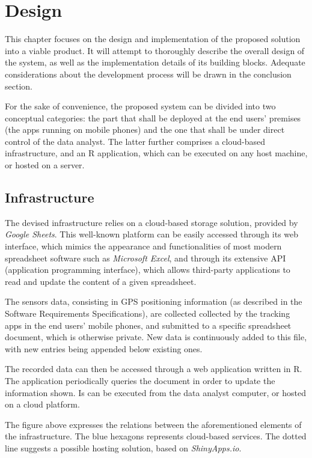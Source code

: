 \chapter{Design}
This chapter focuses on the design and implementation of the proposed solution into a viable product.
It will attempt to thoroughly describe the overall design of the system, as well as the implementation details of its building blocks.
Adequate considerations about the development process will be drawn in the conclusion section.

For the sake of convenience, the proposed system can be divided into two conceptual categories: the part that shall be deployed at the end users' premises (the apps running on mobile phones) and the one that shall be under direct control of the data analyst.
The latter further comprises a cloud-based infrastructure, and an R application, which can be executed on any host machine, or hosted on a server.


\section{Infrastructure}
The devised infrastructure relies on a cloud-based storage solution, provided by \emph{Google Sheets}.
This well-known platform can be easily accessed through its web interface, which mimics the appearance and functionalities of most modern spreadsheet software such as \emph{Microsoft Excel}, and through its extensive API (application programming interface), which allows third-party applications to read and update the content of a given spreadsheet.

The sensors data, consisting in GPS positioning information (as described in the Software Requirements Specifications), are collected collected by the tracking apps in the end users' mobile phones, and submitted to a specific spreadsheet document, which is otherwise private.
New data is continuously added to this file, with new entries being appended below existing ones.

The recorded data can then be accessed through a web application written in R.
The application periodically queries the document in order to update the information shown.
Is can be executed from the data analyst computer, or hosted on a cloud platform.


The figure above expresses the relations between the aforementioned elements of the infrastructure.
The blue hexagons represents cloud-based services.
The dotted line suggests a possible hosting solution, based on \emph{ShinyApps.io}.



